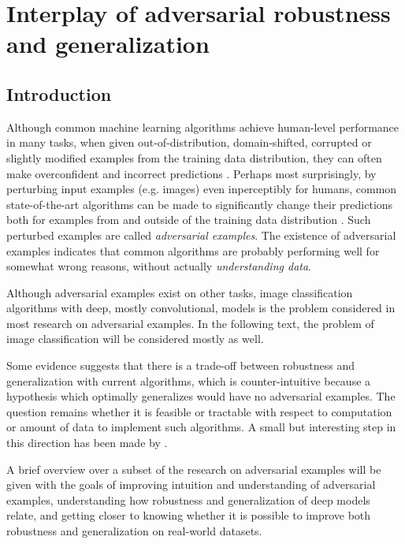 \documentclass[oneside]{book}
\begin{document}
\fi
\chapter{Interplay of adversarial robustness and generalization}



\section{Introduction}

Although common machine learning algorithms achieve human-level performance in many tasks, when given out-of-distribution, domain-shifted, corrupted or slightly modified examples from the training data distribution, they can often make overconfident and incorrect predictions \citep{Hendrycks:2016:BDMOODE,Ganin:2015:UDAB,Nguyen:2015:DNNEFHCPUI,Hendrycks:2019:BNNRCCP,Engstrom:2017:RTSFCST,Szegedy:2013:IPNN}. Perhaps most surprisingly, by perturbing input examples (e.g. images) even inperceptibly for humans, common state-of-the-art algorithms can be made to significantly change their predictions both for examples from and outside of the training data distribution \citep{Szegedy:2013:IPNN, Goodfellow:2014:EHAE}. Such perturbed examples are called \textit{adversarial examples}. The existence of adversarial examples indicates that common algorithms are probably performing well for somewhat wrong reasons, without actually \textit{understanding data}.

Although adversarial examples exist on other tasks, image classification algorithms with deep, mostly convolutional, models is the problem considered in most research on adversarial examples. In the following text, the problem of image classification will be considered mostly as well.

Some evidence suggests that there is a trade-off between robustness and generalization \citep{Tsipras:2018:RMBOA,Madry:2017:TDLMRAA,Su:2018:IRTCOACSRDICM} with current algorithms, which is counter-intuitive because a hypothesis which optimally generalizes would have no adversarial examples. The question remains whether it is feasible or tractable with respect to computation or amount of data to implement such algorithms. A small but interesting step in this direction has been made by \citep{Stutz:2018:DARG}.

A brief overview over a subset of the research on adversarial examples will be given with the goals of improving intuition and understanding of adversarial examples, understanding how robustness and generalization of deep models relate, and getting closer to knowing whether it is possible to improve both robustness and generalization on real-world datasets. 
\end{document}
